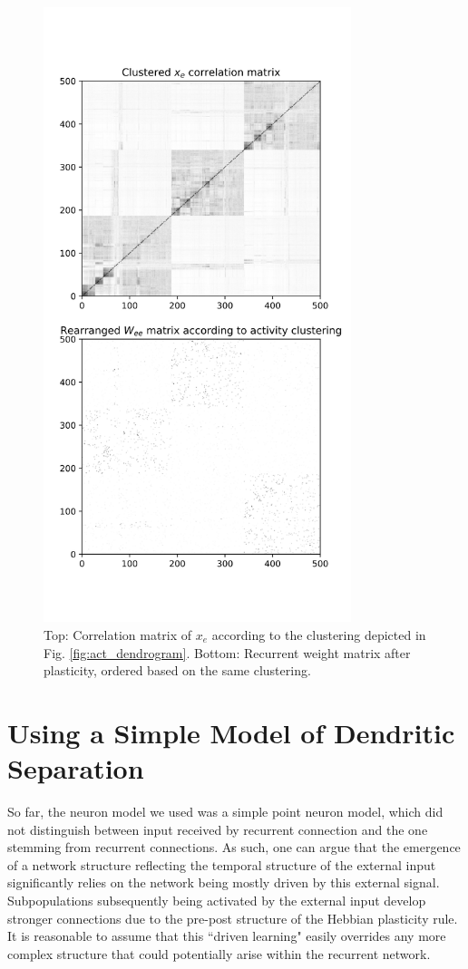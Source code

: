 \documentclass[10pt,a4paper]{article}
\begin{document}
\begin{figure}
\includegraphics[width=0.8\textwidth]{../../plots/corr_weight_mat.png}
\caption{\label{fig:corr_weight_mat} Top: Correlation matrix of $x_e$ according to the clustering depicted in Fig. \ref{fig:act_dendrogram}. Bottom: Recurrent weight matrix after plasticity, ordered based on the same clustering.}
\end{figure}

\section{Using a Simple Model of Dendritic Separation}
So far, the neuron model we used was a simple point neuron model, which did not distinguish between input received by recurrent connection and the one stemming from recurrent connections. As such, one can argue that the emergence of a network structure reflecting the temporal structure of the external input significantly relies on the network being mostly driven by this external signal. Subpopulations subsequently being activated by the external input develop stronger connections due to the pre-post structure of the Hebbian plasticity rule. It is reasonable to assume that this ``driven learning" easily overrides any more complex structure that could potentially arise within the recurrent network.
\end{document}
